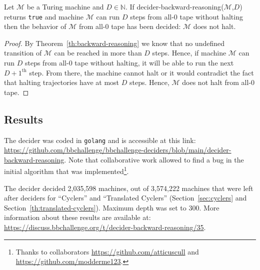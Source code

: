 \begin{corollary}
  Let $\mathcal{M}$ be a Turing machine and $D\in\mathbb{N}$. If {\sc decider-backward-reasoning}($\mathcal{M}$,$D$) returns \texttt{true} and machine $\mathcal{M}$ can run $D$ steps from all-0 tape without halting then the behavior of $\mathcal{M}$ from all-0 tape has been decided: $\mathcal{M}$ does not halt.
\end{corollary}
\begin{proof}
  By Theorem~\ref{th:backward-reasoning} we know that no undefined transition of $\mathcal{M}$ can be reached in more than $D$ steps. Hence, if machine $\mathcal{M}$ can run $D$ steps from all-0 tape without halting, it will be able to run the next $D+1^{\text{th}}$ step. From there, the machine cannot halt or it would contradict the fact that halting trajectories have at most $D$ steps. Hence, $\mathcal{M}$ does not halt from all-0 tape.
\end{proof}

\subsection{Results}\label{sec:backward-reasoning-results}

The decider was coded in \texttt{golang} and is accessible at this link: \url{https://github.com/bbchallenge/bbchallenge-deciders/blob/main/decider-backward-reasoning}. Note that collaborative work allowed to find a bug in the initial algorithm that was implemented\footnote{Thanks to collaborators \url{https://github.com/atticuscull} and \url{https://github.com/modderme123}.}.

The decider decided 2,035,598 machines, out of 3,574,222 machines that were left after deciders for ``Cyclers'' and ``Translated Cyclers'' (Section~\ref{sec:cyclers} and Section~\ref{th:translated-cyclers}). Maximum depth was set to 300. More information about these results are available at: \url{https://discuss.bbchallenge.org/t/decider-backward-reasoning/35}.
